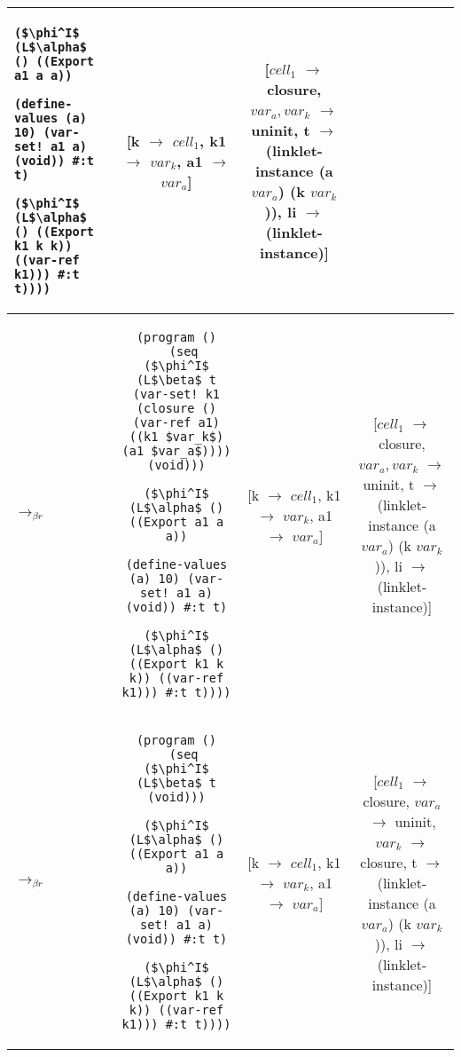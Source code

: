 \begin{adjustbox}{center}
\begin{tabular}{lc|c|c}
\begin{lstlisting}[mathescape]
        ($\phi^I$ (L$\alpha$ () ((Export a1 a a))
                (define-values (a) 10) (var-set! a1 a) (void)) #:t t)
        ($\phi^I$ (L$\alpha$ () ((Export k1 k k)) ((var-ref k1))) #:t t))))
    \end{lstlisting} & \thead{[k $\rightarrow$ $cell_1$,\\k1 $\rightarrow$ $var_k$,\\a1 $\rightarrow$ $var_a$]} & \thead{[$cell_1$ $\rightarrow$ closure,\\$var_a,var_k$ $\rightarrow$ uninit,\\t $\rightarrow$ (linklet-instance\\(a $var_a$) (k $var_k$)),\\li $\rightarrow$ (linklet-instance)]} \\ \hline
    $\longrightarrow_{\beta r}$&\begin{lstlisting}[mathescape]
(program ()
  (seq ($\phi^I$ (L$\beta$ t (var-set! k1 (closure () (var-ref a1) ((k1 $var_k$) (a1 $var_a$)))) (void)))
        ($\phi^I$ (L$\alpha$ () ((Export a1 a a))
                (define-values (a) 10) (var-set! a1 a) (void)) #:t t)
        ($\phi^I$ (L$\alpha$ () ((Export k1 k k)) ((var-ref k1))) #:t t))))
    \end{lstlisting} & \thead{[k $\rightarrow$ $cell_1$,\\k1 $\rightarrow$ $var_k$,\\a1 $\rightarrow$ $var_a$]} & \thead{[$cell_1$ $\rightarrow$ closure,\\$var_a,var_k$ $\rightarrow$ uninit,\\t $\rightarrow$ (linklet-instance\\(a $var_a$) (k $var_k$)),\\li $\rightarrow$ (linklet-instance)]} \\ \hline
    $\longrightarrow_{\beta r}$&\begin{lstlisting}[mathescape]
(program ()
  (seq ($\phi^I$ (L$\beta$ t (void)))
        ($\phi^I$ (L$\alpha$ () ((Export a1 a a))
                (define-values (a) 10) (var-set! a1 a) (void)) #:t t)
        ($\phi^I$ (L$\alpha$ () ((Export k1 k k)) ((var-ref k1))) #:t t))))
    \end{lstlisting} & \thead{[k $\rightarrow$ $cell_1$,\\k1 $\rightarrow$ $var_k$,\\a1 $\rightarrow$ $var_a$]} & \thead{[$cell_1$ $\rightarrow$ closure,\\$var_a$ $\rightarrow$ uninit,\\$var_k$ $\rightarrow$ closure,\\t $\rightarrow$ (linklet-instance\\(a $var_a$) (k $var_k$)),\\li $\rightarrow$ (linklet-instance)]} \\ \hline

\end{tabular}
\end{adjustbox}
